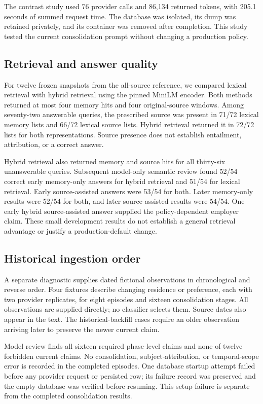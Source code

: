The contrast study used 76 provider calls and 86,134 returned tokens, with
205.1 seconds of summed request time. The database was isolated, its dump was
retained privately, and its container was removed after completion. This study
tested the current consolidation prompt without changing a production policy.

\subsection{Retrieval and answer quality}

For twelve frozen snapshots from the all-source reference, we compared lexical
retrieval with hybrid retrieval using the pinned MiniLM encoder. Both methods
returned at most four memory hits and four original-source windows. Among
seventy-two answerable queries, the prescribed source was present in 71/72
lexical memory lists and 66/72 lexical source lists. Hybrid retrieval returned
it in 72/72 lists for both representations. Source presence does not establish
entailment, attribution, or a correct answer.

Hybrid retrieval also returned memory and source hits for all thirty-six
unanswerable queries. Subsequent model-only semantic review found 52/54 correct
early memory-only answers for hybrid retrieval and 51/54 for lexical retrieval.
Early source-assisted answers were 53/54 for both. Later memory-only results
were 52/54 for both, and later source-assisted results were 54/54. One early
hybrid source-assisted answer supplied the policy-dependent employer claim.
These small development results do not establish a general retrieval advantage
or justify a production-default change.



\subsection{Historical ingestion order}

A separate diagnostic supplies dated fictional observations in chronological
and reverse order. Four fixtures describe changing residence or preference,
each with two provider replicates, for eight episodes and sixteen consolidation
stages. All observations are supplied directly; no classifier selects them.
Source dates also appear in the text. The historical-backfill cases require an
older observation arriving later to preserve the newer current claim.

Model review finds all sixteen required phase-level claims and none of twelve
forbidden current claims. No consolidation, subject-attribution, or temporal-scope
error is recorded in the completed episodes. One database startup attempt failed
before any provider request or persisted row; its failure record was preserved
and the empty database was verified before resuming. This setup failure is
separate from the completed consolidation results.

